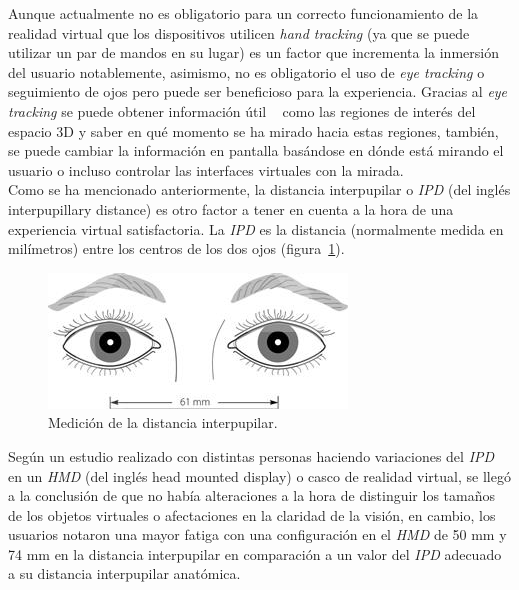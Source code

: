 Aunque actualmente no es obligatorio para un correcto funcionamiento de la realidad virtual que los dispositivos utilicen \textit{hand tracking} (ya que se puede utilizar un par de mandos en su lugar) es un factor que incrementa la inmersión del usuario notablemente, asimismo, no es obligatorio el uso de \textit{eye tracking} o seguimiento de ojos pero puede ser beneficioso para la experiencia. Gracias al \textit{eye tracking} se puede obtener información útil ~\cite{eyetrackingVR} como las regiones de interés del espacio 3D y saber en qué momento se ha mirado hacia estas regiones, también, se puede cambiar la información en pantalla basándose en dónde está mirando el usuario o incluso controlar las interfaces virtuales con la mirada.\\

Como se ha mencionado anteriormente, la distancia interpupilar o \textit{IPD} (del inglés interpupillary distance) es otro factor a tener en cuenta a la hora de una experiencia virtual satisfactoria. La \textit{IPD} es la distancia (normalmente medida en milímetros) entre los centros de los dos ojos (figura~\ref{fig:IPDExample}).

\begin{figure}[H]
    \centering
    \includegraphics[scale=1]{Images/Estado del arte/IPD.jpg}
    \caption{Medición de la distancia interpupilar.}
    \label{fig:IPDExample}
\end{figure}

Según un estudio realizado con distintas personas haciendo variaciones del \textit{IPD}~\cite{IPDTest} en un \textit{HMD} (del inglés head mounted display) o casco de realidad virtual, se llegó a la conclusión de que no había alteraciones a la hora de distinguir los tamaños de los objetos virtuales o afectaciones en la claridad de la visión, en cambio, los usuarios notaron una mayor fatiga con una configuración en el \textit{HMD} de 50 mm y 74 mm en la distancia interpupilar en comparación a un valor del \textit{IPD} adecuado a su distancia interpupilar anatómica.




